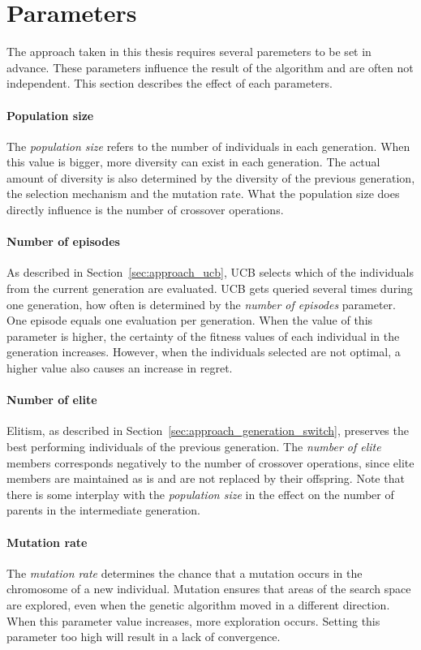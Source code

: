 \section{Parameters}
The approach taken in this thesis requires several paremeters to be set in
advance. These parameters influence the result of the algorithm and are often
not independent. This section describes the effect of each parameters.
\paragraph{Population size} The \emph{population size} refers to the number of individuals in each generation.
When this value is bigger, more diversity can exist in each generation.
The actual amount of diversity is also determined by the diversity of the
previous generation, the selection mechanism and the mutation rate.
What the population size does directly influence is the number of crossover
operations.

\paragraph{Number of episodes} As described in Section~\ref{sec:approach_ucb}, UCB selects which of the
individuals from the current generation are evaluated. UCB gets queried several
times during one generation, how often is determined by the \emph{number of
episodes} parameter. One episode equals one evaluation per generation. When
the value of this parameter is higher, the certainty of the fitness values of
each individual in the generation increases. However, when the individuals
selected are not optimal, a higher value also causes an increase in regret.
\paragraph{Number of elite} Elitism, as described in Section~\ref{sec:approach_generation_switch},
preserves the best performing individuals of the previous generation. The
\emph{number of elite} members corresponds negatively to the number of
crossover operations, since elite members are maintained as is and are not
replaced by their offspring. Note that there is some interplay with
the \emph{population size} in the effect on the number of parents in the
intermediate generation.
\paragraph{Mutation rate} The \emph{mutation rate} determines the chance that a mutation occurs in the
chromosome of a new individual. Mutation ensures that areas of the search space
are explored, even when the genetic algorithm moved in a different direction.
When this parameter value increases, more exploration occurs. Setting this
parameter too high will result in a lack of convergence.
